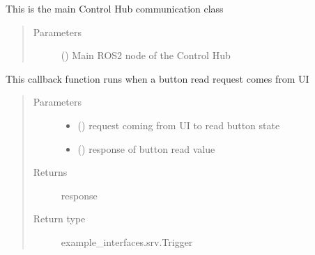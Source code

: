\documentclass[letterpaper,10pt,english]{sphinxmanual}
\begin{document}
\begin{fulllineitems}
\label{\detokenize{index:Control_Hub.control_hub.control_hub.ClientNode}}
This is the main Control Hub communication class
\begin{quote}\begin{description}
\item[{Parameters}] \leavevmode
{} () \textendash{} Main ROS2 node of the Control Hub

\end{description}\end{quote}

\begin{fulllineitems}
\label{\detokenize{index:Control_Hub.control_hub.control_hub.ClientNode.callback_button_state}}
This callback function runs when a button read request comes from UI
\begin{quote}\begin{description}
\item[{Parameters}] \leavevmode\begin{itemize}
\item {} 
 () \textendash{} request coming from UI to read button state

\item {} 
 () \textendash{} response of button read value

\end{itemize}

\item[{Returns}] \leavevmode
response

\item[{Return type}] \leavevmode
example\_interfaces.srv.Trigger

\end{description}\end{quote}


\end{fulllineitems}
\end{fulllineitems}
\end{document}
